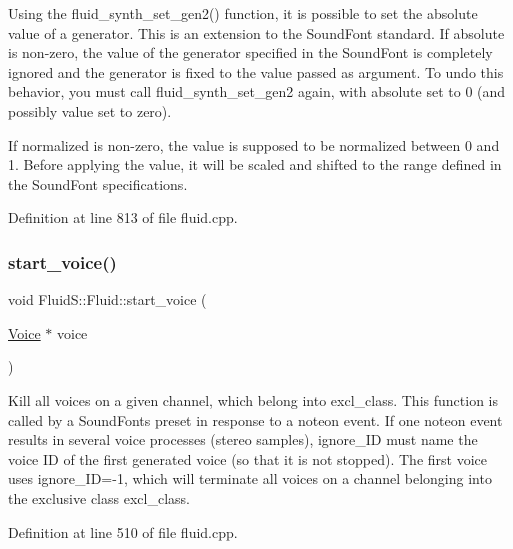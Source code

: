 Using the fluid\+\_\+synth\+\_\+set\+\_\+gen2() function, it is possible to set the absolute value of a generator. This is an extension to the Sound\+Font standard. If \textquotesingle{}absolute\textquotesingle{} is non-\/zero, the value of the generator specified in the Sound\+Font is completely ignored and the generator is fixed to the value passed as argument. To undo this behavior, you must call fluid\+\_\+synth\+\_\+set\+\_\+gen2 again, with \textquotesingle{}absolute\textquotesingle{} set to 0 (and possibly \textquotesingle{}value\textquotesingle{} set to zero).

If \textquotesingle{}normalized\textquotesingle{} is non-\/zero, the value is supposed to be normalized between 0 and 1. Before applying the value, it will be scaled and shifted to the range defined in the Sound\+Font specifications. 

Definition at line 813 of file fluid.\+cpp.

\mbox{\label{class_fluid_s_1_1_fluid_a77103198aa6cb4a982178ac575fac1a7}} 
\subsubsection{\texorpdfstring{start\+\_\+voice()}{start\_voice()}}
{\footnotesize\ttfamily void Fluid\+S\+::\+Fluid\+::start\+\_\+voice (\begin{DoxyParamCaption}\item[{\hyperlink{class_fluid_s_1_1_voice}{Voice} $\ast$}]{voice }\end{DoxyParamCaption})}

Kill all voices on a given channel, which belong into excl\+\_\+class. This function is called by a Sound\+Font\textquotesingle{}s preset in response to a noteon event. If one noteon event results in several voice processes (stereo samples), ignore\+\_\+\+ID must name the voice ID of the first generated voice (so that it is not stopped). The first voice uses ignore\+\_\+\+ID=-\/1, which will terminate all voices on a channel belonging into the exclusive class excl\+\_\+class.

Definition at line 510 of file fluid.\+cpp.

\mbox{\label{class_fluid_s_1_1_fluid_abfefd9b9ccfb4a43148aeca8a5f052f1}} 
